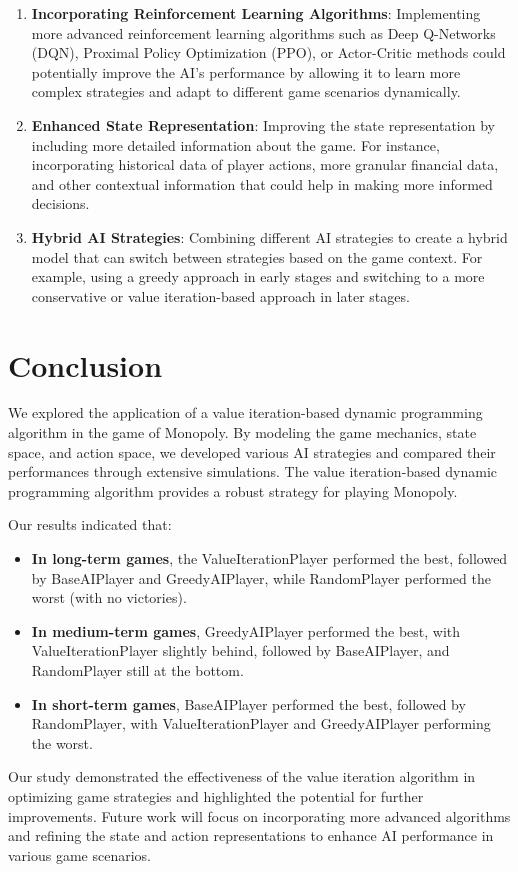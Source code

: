 \documentclass{article}
\begin{document}
\begin{enumerate}
    \item \textbf{Incorporating Reinforcement Learning Algorithms}:
   Implementing more advanced reinforcement learning algorithms such as Deep Q-Networks (DQN), Proximal Policy Optimization (PPO), or Actor-Critic methods could potentially improve the AI's performance by allowing it to learn more complex strategies and adapt to different game scenarios dynamically.

    \item \textbf{Enhanced State Representation}:
   Improving the state representation by including more detailed information about the game. For instance, incorporating historical data of player actions, more granular financial data, and other contextual information that could help in making more informed decisions.

    \item \textbf{Hybrid AI Strategies}:
   Combining different AI strategies to create a hybrid model that can switch between strategies based on the game context. For example, using a greedy approach in early stages and switching to a more conservative or value iteration-based approach in later stages.
\end{enumerate}
   
\section{Conclusion}
We explored the application of a value iteration-based dynamic programming algorithm in the game of Monopoly. By modeling the game mechanics, state space, and action space, we developed various AI strategies and compared their performances through extensive simulations. The value iteration-based dynamic programming algorithm provides a robust strategy for playing Monopoly. 

Our results indicated that:
\begin{itemize}
    \item \textbf{In long-term games}, the ValueIterationPlayer performed the best, followed by BaseAIPlayer and GreedyAIPlayer, while RandomPlayer performed the worst (with no victories).
    \item \textbf{In medium-term games}, GreedyAIPlayer performed the best, with ValueIterationPlayer slightly behind, followed by BaseAIPlayer, and RandomPlayer still at the bottom.
    \item \textbf{In short-term games}, BaseAIPlayer performed the best, followed by RandomPlayer, with ValueIterationPlayer and GreedyAIPlayer performing the worst.
\end{itemize}

Our study demonstrated the effectiveness of the value iteration algorithm in optimizing game strategies and highlighted the potential for further improvements. Future work will focus on incorporating more advanced algorithms and refining the state and action representations to enhance AI performance in various game scenarios.
\end{document}
